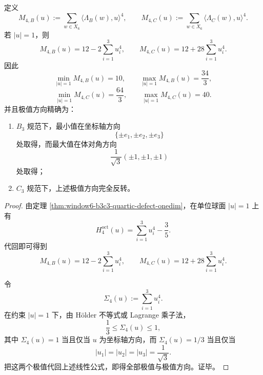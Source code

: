 \begin{theorem}\label{thm:window6-b3c3-quartic-axis-diagonal-reversal}
定义
\[
M_{4,B}(u):=\sum_{w\in X_6}\langle \Lambda_B(w),u\rangle^4,
\qquad
M_{4,C}(u):=\sum_{w\in X_6}\langle \Lambda_C(w),u\rangle^4.
\]
若 \(|u|=1\)，则
\[
M_{4,B}(u)=12-2\sum_{i=1}^{3}u_i^4,
\qquad
M_{4,C}(u)=12+28\sum_{i=1}^{3}u_i^4.
\]
因此
\[
\min_{|u|=1}M_{4,B}(u)=10,
\qquad
\max_{|u|=1}M_{4,B}(u)=\frac{34}{3},
\]
\[
\min_{|u|=1}M_{4,C}(u)=\frac{64}{3},
\qquad
\max_{|u|=1}M_{4,C}(u)=40.
\]
并且极值方向精确为：
\begin{enumerate}
  \item \(B_3\) 规范下，最小值在坐标轴方向
  \[
  \{\pm e_1,\pm e_2,\pm e_3\}
  \]
  处取得，而最大值在体对角方向
  \[
  \frac{1}{\sqrt3}(\pm 1,\pm 1,\pm 1)
  \]
  处取得；
  \item \(C_3\) 规范下，上述极值方向完全反转。
\end{enumerate}
\end{theorem}
\begin{proof}
由定理 \ref{thm:window6-b3c3-quartic-defect-onedim}，在单位球面 \(|u|=1\) 上有
\[
H_4^{\mathrm{oct}}(u)=\sum_{i=1}^{3}u_i^4-\frac35.
\]
代回即可得到
\[
M_{4,B}(u)=12-2\sum_{i=1}^{3}u_i^4,
\qquad
M_{4,C}(u)=12+28\sum_{i=1}^{3}u_i^4.
\]

令
\[
\Sigma_4(u):=\sum_{i=1}^{3}u_i^4.
\]
在约束 \(|u|=1\) 下，由 Hölder 不等式或 Lagrange 乘子法，
\[
\frac13\le \Sigma_4(u)\le 1,
\]
其中 \(\Sigma_4(u)=1\) 当且仅当 \(u\) 为坐标轴方向，而 \(\Sigma_4(u)=1/3\) 当且仅当
\[
|u_1|=|u_2|=|u_3|=\frac{1}{\sqrt3}.
\]
把这两个极值代回上述线性公式，即得全部极值与极值方向。证毕。
\end{proof}

